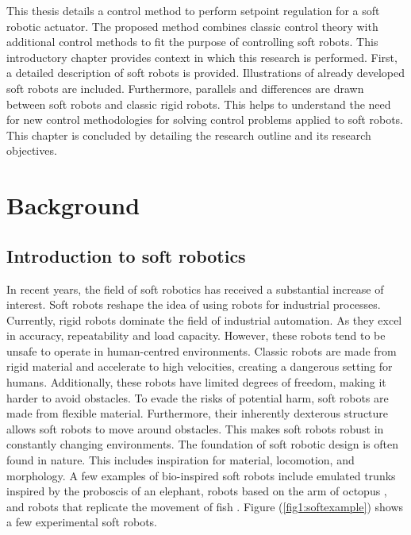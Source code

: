 This thesis details a control method to perform setpoint regulation for a soft robotic actuator. The proposed method combines classic control theory with additional control methods to fit the purpose of controlling soft robots. This introductory chapter provides context in which this research is performed. First, a detailed description of soft robots is provided. Illustrations of already developed soft robots are included. Furthermore, parallels and differences are drawn between soft robots and classic rigid robots. This helps to understand the need for new control methodologies for solving control problems applied to soft robots. This chapter is concluded by detailing the research outline and its research objectives.


\section{Background}



\subsection{Introduction to soft robotics}

In recent years, the field of soft robotics has received a substantial increase of interest. Soft robots reshape the idea of using robots for industrial processes. Currently, rigid robots dominate the field of industrial automation. As they excel in accuracy, repeatability and load capacity. However, these robots tend to be unsafe to operate in human-centred environments. Classic robots are made from rigid material and accelerate to high velocities, creating a dangerous setting for humans. Additionally, these robots have limited degrees of freedom, making it harder to avoid obstacles. To evade the risks of potential harm, soft robots are made from flexible material. Furthermore, their inherently dexterous structure allows soft robots to move around obstacles. This makes soft robots robust in constantly changing environments. The foundation of soft robotic design is often found in nature. This includes inspiration for material, locomotion, and morphology. A few examples of bio-inspired soft robots include emulated trunks \cite{hannan2003kinematics} inspired by the proboscis of an elephant, robots based on the arm of octopus \cite{wang2013visual}, and robots that replicate the movement of fish \cite{marchese2014}. Figure (\ref{fig1:softexample}) shows a few experimental soft robots. 


